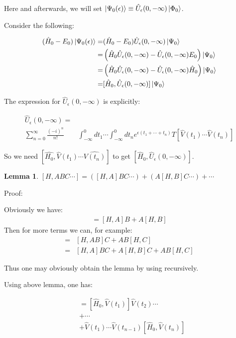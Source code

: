 \documentclass{article}
\numberwithin{equation}{subsection} %
\newtheorem{lemma}{Lemma}
\begin{document}
Here and afterwards, we will set $\ket{\Psi_0(\epsilon)} \equiv \hat{U}_\epsilon(0,-\infty) \ket{\Phi_0}$.

Consider the following:

\begin{align}
(\hat{H}_0-E_0) \ket{\Psi_0(\epsilon)} =& (\hat{H}_0 - E_0)\hat{U}_\epsilon(0,-\infty)\ket{\Psi_0} \\		
=& \left( \hat{H}_0 \hat{U}_\epsilon(0,-\infty) - \hat{U}_\epsilon(0,-\infty)E_0\right)  \ket{\Psi_0} \\
=& \left( \hat{H}_0\hat{U}_\epsilon(0,-\infty) - \hat{U}_\epsilon(0,-\infty) \hat{H}_0\right) \ket{\Psi_0} \\
=& [\hat{H}_0, \hat{U}_\epsilon(0,-\infty)] \ket{\Psi_0}
\label{eq:6.46}
\end{align}

The expression for $\hat{U}_\epsilon(0,-\infty)$ is explicitly:

\begin{align}
\hat{U}_\epsilon(0,-\infty) =& \nonumber\\
\sum_{n=0}^{\infty} \frac{(-i)^n}{n!} &\int_{-\infty}^{0} dt_1 \dotsb \int_{-\infty}^{0} dt_n e^{\epsilon(t_1+\dotsb+t_n)} T[\hat{V}(t_1)\dotsb \hat{V}(t_n)]
\end{align}

So we need $[\hat{H_0}, \hat{V}(t_1)\dotsb\hat{{V}(t_n)}]$ to get $[\hat{H}_0, \hat{U}_\epsilon(0,-\infty)]$.

\begin{lemma}
	$[H,ABC\dotsb] = \left( [H,A] BC\dotsb\right)  + \left( A[H,B]C\dotsb\right)  + \dotsb$
\end{lemma}

Proof:

Obviously we have: 
\begin{align}[H,AB] = [H,A]B + A[H,B] \label{eq:HAB}\end{align}
Then for more terms we can, for example:
\begin{align}
[H,ABC] =& [H,AB] C + AB[H,C] \nonumber\\
=& [H,A]BC + A[H,B]C + AB[H,C] \nonumber
\end{align}

Thus one may obviously obtain the lemma by using  recursively.

Using above lemma, one has:

\begin{align}
[\hat{H}_0,\hat{V}(t_1)\dotsb\hat{V}(t_n)] &= [\hat{H}_0,\hat{V}(t_1)]\hat{V}(t_2)\dotsb \nonumber\\
&+ \dotsb \nonumber \\
&+ \hat{V}(t_1)\dotsb\hat{V}(t_{n-1})[\hat{H}_0,\hat{V}(t_n)] 
\end{align}
\end{document}
